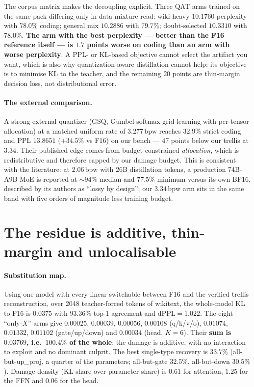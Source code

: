 \documentclass[11pt,a4paper]{article}
\newcommand{\bpw}{\,\mathrm{bpw}}
\begin{document}
The corpus matrix makes the decoupling explicit. Three QAT arms trained on the same pack differing
only in data mixture read: wiki-heavy $10.1760$ perplexity with $78.0\%$ coding; general mix
$10.2886$ with $79.7\%$; doubt-selected $10.3310$ with $78.0\%$. \textbf{The arm with the best
perplexity --- better than the F16 reference itself --- is $1.7$ points worse on coding than an arm
with worse perplexity}. A PPL- or KL-based objective cannot select the artifact you want, which is
also why quantization-aware distillation cannot help: its objective is to minimise KL to the
teacher, and the remaining $20$ points are thin-margin decision loss, not distributional error.

\paragraph{The external comparison.} A strong external quantizer (GSQ, Gumbel-softmax grid
learning with per-tensor allocation) at a matched uniform rate of $3.277\bpw$ reaches $32.9\%$
strict coding and PPL $13.8651$ ($+34.5\%$ vs F16) on our bench --- $47$ points below our trellis
at $3.34$. Their published edge comes from budget-constrained \emph{allocation}, which is
redistributive and therefore capped by our damage budget. This is consistent with the literature:
at $2.06\bpw$ with $26$B distillation tokens, a production 74B-A9B MoE is reported at $\sim$94\%
median and $77.5\%$ minimum versus its own BF16, described by its authors as ``lossy by design'';
our $3.34\bpw$ arm sits in the same band with five orders of magnitude less training budget.

\section{The residue is additive, thin-margin and unlocalisable}
\label{sec:residue}

\paragraph{Substitution map.} Using one model with every linear switchable between F16 and the
verified trellis reconstruction, over 2048 teacher-forced tokens of wikitext, the whole-model
KL to F16 is $0.0375$ with $93.36\%$ top-1 agreement and $\mathrm{dPPL}=1.022$. The eight
``only-$X$'' arms give $0.00025$, $0.00039$, $0.00056$, $0.00108$ (q/k/v/o),
$0.01074$, $0.01332$, $0.01102$ (gate/up/down) and $0.00034$ (head, $K=6$). Their \textbf{sum is
$0.03769$, i.e.\ $100.4\%$ of the whole}: the damage is additive, with no interaction to exploit
and no dominant culprit. The best single-type recovery is $33.7\%$ (all-but-up\_proj, a quarter of
the parameters; all-but-gate $32.5\%$, all-but-down $30.5\%$). Damage density (KL share over
parameter share) is $0.61$ for attention, $1.25$ for the FFN and $0.06$ for the head.
\end{document}
